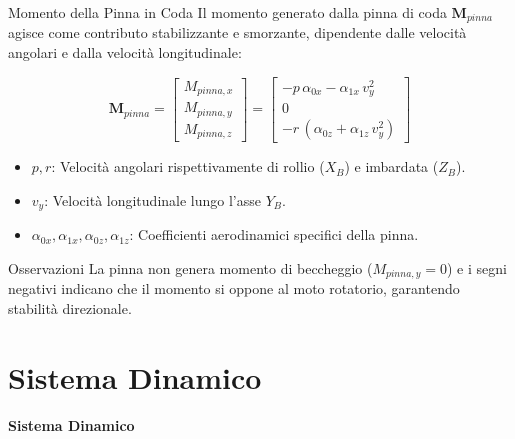 \documentclass[aspectratio=169]{beamer} %
\begin{document}
\begin{frame}{Momento della Pinna in Coda}
    Il momento generato dalla pinna di coda $\bm{M}_{pinna}$ agisce come contributo stabilizzante e smorzante, dipendente dalle velocità angolari e dalla velocità longitudinale:

    \begin{equation}
        \bm{M}_{pinna} = 
        \begin{bmatrix} M_{pinna,x} \\ M_{pinna,y} \\ M_{pinna,z} \end{bmatrix} =
        \begin{bmatrix} 
        -p \, \alpha_{0x} - \alpha_{1x} \, v_y^2 \\ 
        0 \\ 
        -r \, (\alpha_{0z} + \alpha_{1z} \, v_y^2) 
        \end{bmatrix}
    \end{equation}

    \begin{itemize}
        \item $p, r$: Velocità angolari rispettivamente di rollio ($X_B$) e imbardata ($Z_B$).
        \item $v_y$: Velocità longitudinale lungo l'asse $Y_B$.
        \item $\alpha_{0x}, \alpha_{1x}, \alpha_{0z}, \alpha_{1z}$: Coefficienti aerodinamici specifici della pinna.
    \end{itemize}

    \begin{block}{Osservazioni}
        La pinna non genera momento di beccheggio ($M_{pinna,y} = 0$) e i segni negativi indicano che il momento si oppone al moto rotatorio, garantendo stabilità direzionale.
    \end{block}
\end{frame}


\section{Sistema Dinamico}

\begin{frame}
    \vfill
    \centering
    {\Huge \textbf{Sistema Dinamico}}
    \vfill
\end{frame}
\end{document}
